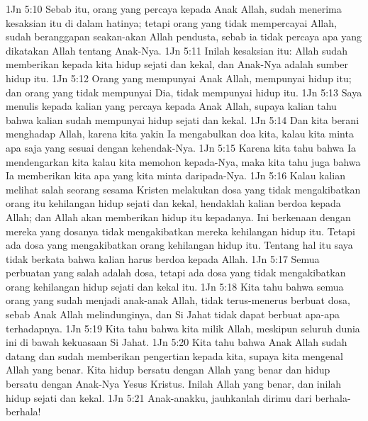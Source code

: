 1Jn 5:10  Sebab itu, orang yang percaya kepada Anak Allah, sudah menerima kesaksian itu di dalam hatinya; tetapi orang yang tidak mempercayai Allah, sudah beranggapan seakan-akan Allah pendusta, sebab ia tidak percaya apa yang dikatakan Allah tentang Anak-Nya.
1Jn 5:11  Inilah kesaksian itu: Allah sudah memberikan kepada kita hidup sejati dan kekal, dan Anak-Nya adalah sumber hidup itu.
1Jn 5:12  Orang yang mempunyai Anak Allah, mempunyai hidup itu; dan orang yang tidak mempunyai Dia, tidak mempunyai hidup itu.
1Jn 5:13  Saya menulis kepada kalian yang percaya kepada Anak Allah, supaya kalian tahu bahwa kalian sudah mempunyai hidup sejati dan kekal.
1Jn 5:14  Dan kita berani menghadap Allah, karena kita yakin Ia mengabulkan doa kita, kalau kita minta apa saja yang sesuai dengan kehendak-Nya.
1Jn 5:15  Karena kita tahu bahwa Ia mendengarkan kita kalau kita memohon kepada-Nya, maka kita tahu juga bahwa Ia memberikan kita apa yang kita minta daripada-Nya.
1Jn 5:16  Kalau kalian melihat salah seorang sesama Kristen melakukan dosa yang tidak mengakibatkan orang itu kehilangan hidup sejati dan kekal, hendaklah kalian berdoa kepada Allah; dan Allah akan memberikan hidup itu kepadanya. Ini berkenaan dengan mereka yang dosanya tidak mengakibatkan mereka kehilangan hidup itu. Tetapi ada dosa yang mengakibatkan orang kehilangan hidup itu. Tentang hal itu saya tidak berkata bahwa kalian harus berdoa kepada Allah.
1Jn 5:17  Semua perbuatan yang salah adalah dosa, tetapi ada dosa yang tidak mengakibatkan orang kehilangan hidup sejati dan kekal itu.
1Jn 5:18  Kita tahu bahwa semua orang yang sudah menjadi anak-anak Allah, tidak terus-menerus berbuat dosa, sebab Anak Allah melindunginya, dan Si Jahat tidak dapat berbuat apa-apa terhadapnya.
1Jn 5:19  Kita tahu bahwa kita milik Allah, meskipun seluruh dunia ini di bawah kekuasaan Si Jahat.
1Jn 5:20  Kita tahu bahwa Anak Allah sudah datang dan sudah memberikan pengertian kepada kita, supaya kita mengenal Allah yang benar. Kita hidup bersatu dengan Allah yang benar dan hidup bersatu dengan Anak-Nya Yesus Kristus. Inilah Allah yang benar, dan inilah hidup sejati dan kekal.
1Jn 5:21  Anak-anakku, jauhkanlah dirimu dari berhala-berhala!



